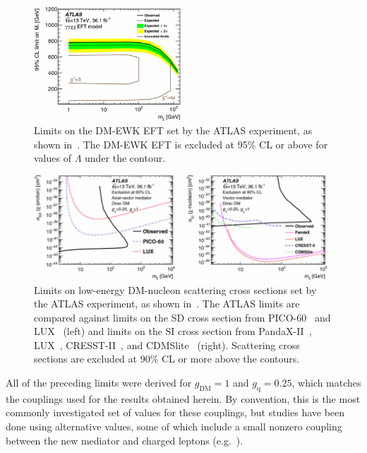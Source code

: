 \documentclass[oneside, letterpaper, 12pt, oldfontcommands]{memoir}
\begin{document}
\begin{figure}[hbtb]
  \begin{center}
    \includegraphics[width=0.49\textwidth]{Figures/dmeft_atlas.png}
    \caption{Limits on the DM-EWK EFT set by the ATLAS experiment, as shown in~\cite{ref:epjc/s10052-017-4965-8}. The DM-EWK EFT is excluded at 95\% CL or above for
    values of $\Lambda$ under the contour.
    }
    \label{fig:dmeft_atlas}
  \end{center}
\end{figure}

\begin{figure}[hbtb]
  \begin{center}
    \includegraphics[width=0.98\textwidth]{Figures/dmsimp_dd_atlas.png}
    \caption{Limits on low-energy DM-nucleon scattering cross sections set by the ATLAS experiment, as shown in~\cite{ref:epjc/s10052-017-4965-8}. The ATLAS
    limits are compared against limits on the SD cross section from PICO-60~\cite{ref:PICO60-ATLAS} and LUX~\cite{ref:LUX-SD-ATLAS} (left)
    and limits on the SI cross section from PandaX-II~\cite{ref:PANDAX-II-ATLAS}, LUX~\cite{ref:LUX-SI-ATLAS}, CRESST-II~\cite{ref:CRESST-II-ATLAS}, and CDMSlite~\cite{ref:SuperCDMS-ATLAS} (right).
    Scattering cross sections are excluded at 90\% CL or more above the contours.
    }
    \label{fig:dmsimp_dd_atlas}
  \end{center}
\end{figure}

All of the preceding limits were derived for $g_\mathrm{DM} = 1$ and $g_\mathrm{q} = 0.25$, which matches the couplings used for the results obtained herein.
By convention, this is the most commonly investigated set of values for these couplings, but studies have been done using alternative values, some of which
include a small nonzero coupling between the new mediator and charged leptons (e.g.~\cite{ref:epjc/s10052-017-4965-8}).
\end{document}
